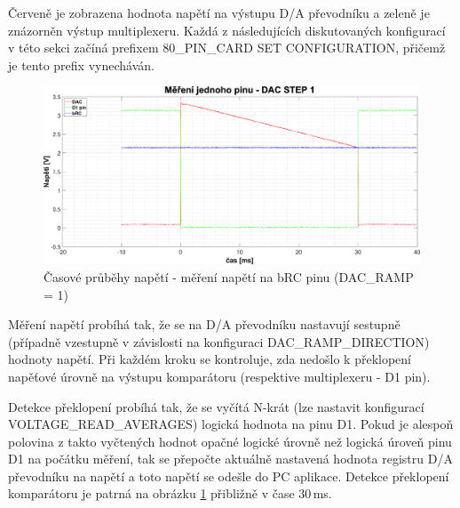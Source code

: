 Červeně je zobrazena hodnota napětí na výstupu D/A převodníku a zeleně je znázorněn výstup multiplexeru. 
Každá z následujících diskutovaných konfigurací v této sekci začíná prefixem 80\_PIN\_CARD SET CONFIGURATION, přičemž je tento prefix vynecháván.\par
\begin{figure}[ht!]
    \centering
    \includegraphics[width =1\textwidth]{obrazky/matlab_generated/pin_step1.eps}
    \caption{Časové průběhy napětí - měření napětí na bRC pinu (DAC\_RAMP = 1)}
    \label{fig: bRC pin voltage measurement DACRAMP1}
\end{figure}
Měření napětí probíhá tak,
že se na D/A převodníku nastavují sestupně (případně vzestupně v závislosti na konfiguraci DAC\_RAMP\_DIRECTION) hodnoty napětí.
Při každém kroku se kontroluje,
zda nedošlo k překlopení napěťové úrovně na výstupu komparátoru (respektive multiplexeru - D1 pin).\par

Detekce překlopení probíhá tak, že se vyčítá N-krát
(lze nastavit konfigurací \linebreak VOLTAGE\_READ\_AVERAGES) logická hodnota na pinu D1.
Pokud je alespoň polovina z takto vyčtených hodnot opačné logické úrovně než logická úroveň pinu D1 na počátku měření,
tak se přepočte aktuálně nastavená hodnota registru D/A převodníku na napětí a toto napětí se odešle do PC aplikace.
Detekce překlopení komparátoru je patrná na obrázku \ref{fig: bRC pin voltage measurement DACRAMP1}
přibližně v čase 30\,ms.\par

